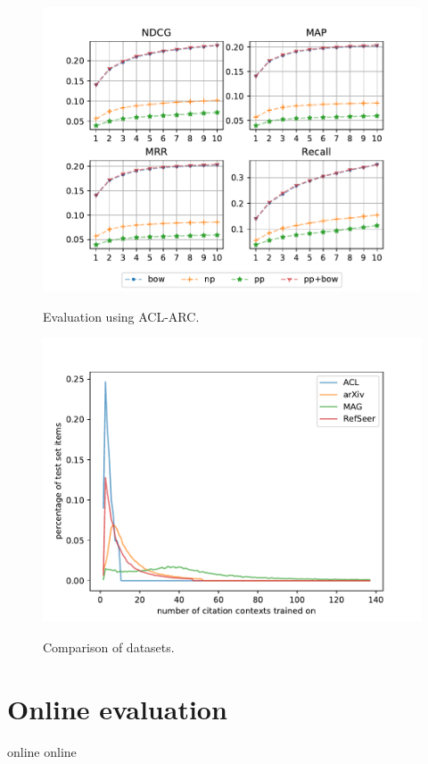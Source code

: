 \begin{figure}
  \centering
    \includegraphics[width=.9\textwidth]{figures/evaluation/ACL.pdf}
  \label{fig:evalacl}
  \caption{Evaluation using ACL-ARC.}
\end{figure}

\begin{figure}
  \centering
    \includegraphics[width=.8\textwidth]{figures/evaluation/comparison_contexts_per_cited_doc.pdf}
  \label{fig:evalcomp}
  \caption{Comparison of datasets.}
\end{figure}

\section{Online evaluation}
online online
